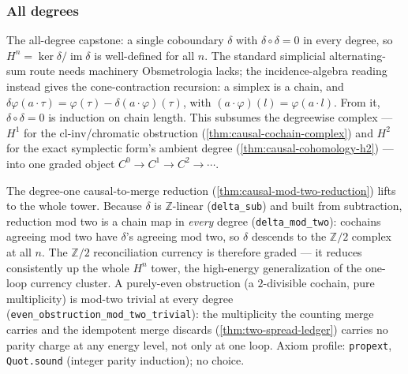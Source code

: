 \subsubsection{All degrees}

\begin{theorem}\label{thm:causal-cohomology-n}\leanok{}
The all-degree capstone: a single coboundary $\delta$ with
$\delta \circ \delta = 0$ in every degree, so
$H^n = \ker\delta / \operatorname{im}\delta$ is well-defined for all $n$. The
standard simplicial alternating-sum route needs machinery Obsmetrologia lacks; the
incidence-algebra reading instead gives the cone-contraction recursion:
a simplex is a chain, and
$\delta\varphi(a\!\cdot\!\tau) =
\varphi(\tau) - \delta(a\!\cdot\!\varphi)(\tau)$, with
$(a\!\cdot\!\varphi)(l) = \varphi(a\!\cdot\! l)$. From it,
$\delta\circ\delta = 0$ is induction on chain length. This subsumes the
degreewise complex --- $H^1$ for the $\mathrm{cl\text{-}inv}$/chromatic
obstruction (\cref{thm:causal-cochain-complex}) and $H^2$ for the exact
symplectic form's ambient degree (\cref{thm:causal-cohomology-h2}) --- into
one graded object $C^0 \to C^1 \to C^2 \to \cdots$.
\end{theorem}

\begin{theorem}\label{thm:reconciliation-currency-graded}\leanok{}
The degree-one causal-to-merge reduction (\cref{thm:causal-mod-two-reduction})
lifts to the whole tower. Because $\delta$ is $\mathbb Z$-linear (\texttt{delta\_sub})
and built from subtraction, reduction mod two is a chain map in \emph{every} degree
(\texttt{delta\_mod\_two}): cochains agreeing mod two have $\delta$'s agreeing mod
two, so $\delta$ descends to the $\mathbb Z/2$ complex at all $n$. The
$\mathbb Z/2$ reconciliation currency is therefore graded --- it reduces
consistently up the whole $H^n$ tower, the high-energy generalization of the
one-loop currency cluster. A purely-even obstruction (a $2$-divisible cochain,
pure multiplicity) is mod-two trivial at every degree
(\texttt{even\_obstruction\_mod\_two\_trivial}): the multiplicity the counting
merge carries and the idempotent merge discards
(\cref{thm:two-spread-ledger}) carries no parity charge at any energy level,
not only at one loop. Axiom profile: \texttt{propext}, \texttt{Quot.sound}
(integer parity induction); no choice.
\end{theorem}

